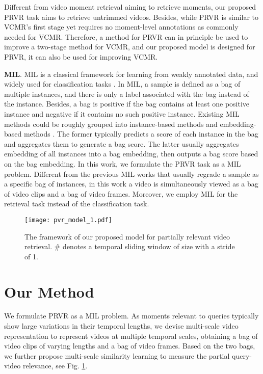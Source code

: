\documentclass[sigconf]{acmart}
\begin{document}
Different from video moment retrieval aiming to retrieve moments, our proposed PRVR task aims to retrieve untrimmed videos.
 Besides, while PRVR is similar to VCMR's first stage yet requires no moment-level annotations as commonly needed for VCMR. Therefore, a method for PRVR can in principle be used to improve a two-stage method for VCMR, and our proposed model is designed for PRVR, it can also be used for improving VCMR. 


\textbf{MIL}. 
MIL \cite{dietterich1997solving,maron1997framework} is a classical framework for learning from weakly annotated data, and widely used for classification tasks \cite{li2021multi,li2021dual}. In MIL, a sample is defined as a bag of multiple instances, and there is only a label associated with the bag instead of the instance. 
Besides, a bag is positive if the bag contains at least one positive instance and negative if it contains no such positive instance. 
Existing MIL methods could be roughly grouped into instance-based methods \cite{pinheiro2015image,oquab2015object,feng2017deep} and embedding-based methods \cite{ilse2018attention,tu2019multiple,li2021dual}.
The former typically predicts a score of each instance in the bag and aggregates them to generate a bag score. The latter usually aggregates embedding of all instances into a bag embedding, then outputs a bag score based on the bag embedding.
In this work, we formulate the PRVR task as a MIL problem.
Different from the previous MIL works that usually regrade a sample as a specific bag of instances, in this work a video is simultaneously viewed as a bag of video clips and a bag of video frames. Moreover, we employ MIL for the retrieval task instead of the classification task.



\begin{figure}[tb!]
\centering\texttt{[image: pvr\_model\_1.pdf]}
\vspace{-8mm}
\caption{The framework of our proposed model for partially relevant video retrieval.
\# denotes a temporal sliding window of size  with a stride of 1.
}\label{fig:framework}
\vspace{-4mm}
\end{figure}

\section{Our Method}
We formulate PRVR as a MIL problem. 
As moments relevant to queries typically show large variations in their temporal lengths, we devise multi-scale video representation to represent videos at multiple temporal scales, obtaining a bag of video clips of varying lengths and a bag of video frames. Based on the two bags, we further propose multi-scale similarity learning to measure the partial query-video relevance, see Fig. \ref{fig:framework}.
\end{document}
